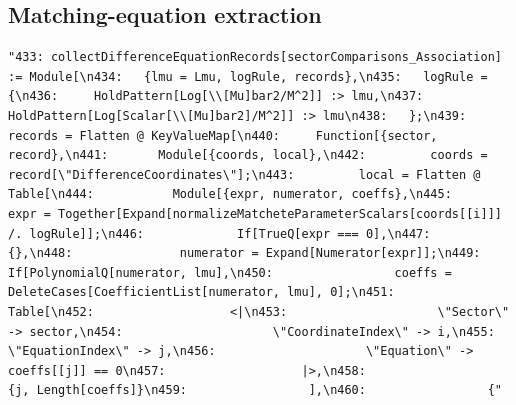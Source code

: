 \documentclass[11pt]{article}
\begin{document}
\subsection{Matching-equation extraction}
\begin{verbatim}
"433: collectDifferenceEquationRecords[sectorComparisons_Association] := Module[\n434:   {lmu = Lmu, logRule, records},\n435:   logRule = {\n436:     HoldPattern[Log[\\[Mu]bar2/M^2]] :> lmu,\n437:     HoldPattern[Log[Scalar[\\[Mu]bar2]/M^2]] :> lmu\n438:   };\n439:   records = Flatten @ KeyValueMap[\n440:     Function[{sector, record},\n441:       Module[{coords, local},\n442:         coords = record[\"DifferenceCoordinates\"];\n443:         local = Flatten @ Table[\n444:           Module[{expr, numerator, coeffs},\n445:             expr = Together[Expand[normalizeMatcheteParameterScalars[coords[[i]]] /. logRule]];\n446:             If[TrueQ[expr === 0],\n447:               {},\n448:               numerator = Expand[Numerator[expr]];\n449:               If[PolynomialQ[numerator, lmu],\n450:                 coeffs = DeleteCases[CoefficientList[numerator, lmu], 0];\n451:                 Table[\n452:                   <|\n453:                     \"Sector\" -> sector,\n454:                     \"CoordinateIndex\" -> i,\n455:                     \"EquationIndex\" -> j,\n456:                     \"Equation\" -> coeffs[[j]] == 0\n457:                   |>,\n458:                   {j, Length[coeffs]}\n459:                 ],\n460:                 {"
\end{verbatim}
\end{document}
